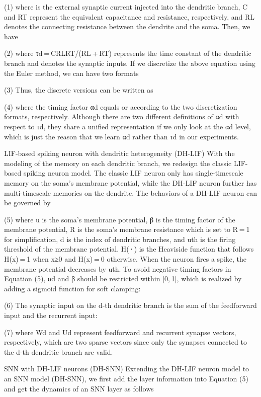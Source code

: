 (1)
where 
 is the external synaptic current injected into the dendritic branch, C and RT represent the equivalent capacitance and resistance, respectively, and RL denotes the connecting resistance between the dendrite and the soma. Then, we have

(2)
where τd = CRLRT/(RL + RT) represents the time constant of the dendritic branch and 
 denotes the synaptic inputs. If we discretize the above equation using the Euler method, we can have two formats

(3)
Thus, the discrete versions can be written as

(4)
where the timing factor αd equals 
 or 
 according to the two discretization formats, respectively. Although there are two different definitions of αd with respect to τd, they share a unified representation if we only look at the αd level, which is just the reason that we learn αd rather than τd in our experiments.

LIF-based spiking neuron with dendritic heterogeneity (DH-LIF)
With the modeling of the memory on each dendritic branch, we redesign the classic LIF-based spiking neuron model. The classic LIF neuron only has single-timescale memory on the soma’s membrane potential, while the DH-LIF neuron further has multi-timescale memories on the dendrite. The behaviors of a DH-LIF neuron can be governed by

(5)
where u is the soma’s membrane potential, β is the timing factor of the membrane potential, R is the soma’s membrane resistance which is set to R = 1 for simplification, d is the index of dendritic branches, and uth is the firing threshold of the membrane potential. H( ⋅ ) is the Heaviside function that follows H(x) = 1 when x≥0 and H(x) = 0 otherwise. When the neuron fires a spike, the membrane potential decreases by uth. To avoid negative timing factors in Equation (5), αd and β should be restricted within [0, 1], which is realized by adding a sigmoid function for soft clamping:

(6)
The synaptic input on the d-th dendritic branch is the sum of the feedforward input and the recurrent input:

(7)
where Wd and Ud represent feedforward and recurrent synapse vectors, respectively, which are two sparse vectors since only the synapses connected to the d-th dendritic branch are valid.

SNN with DH-LIF neurons (DH-SNN)
Extending the DH-LIF neuron model to an SNN model (DH-SNN), we first add the layer information into Equation (5) and get the dynamics of an SNN layer as follows

